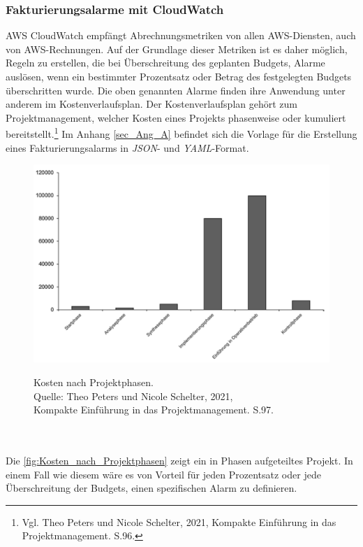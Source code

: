 \subsubsection*{Fakturierungsalarme mit CloudWatch}
AWS CloudWatch empfängt Abrechnungsmetriken von allen AWS-Diensten, auch von AWS-Rechnungen. Auf der Grundlage dieser Metriken ist es daher möglich, Regeln zu erstellen, die bei Überschreitung des geplanten Budgets, Alarme auslösen, wenn ein bestimmter Prozentsatz oder Betrag des festgelegten Budgets überschritten wurde. Die oben genannten Alarme finden ihre Anwendung unter anderem im Kostenverlaufsplan. Der Kostenverlaufsplan gehört zum Projektmanagement, welcher Kosten eines Projekts phasenweise oder kumuliert bereitstellt.\footnote{Vgl. Theo Peters und Nicole Schelter, 2021, Kompakte Einführung in das Projektmanagement. S.96\cite{PM1}.} Im Anhang \ref{sec_Ang_A} befindet sich die Vorlage für die Erstellung eines Fakturierungsalarms in \textit{JSON}- und \textit{YAML}-Format.
\begin{figure}[h!]
  \centering
  \includegraphics[scale=0.45]{sources/Kosten_nach_Projektphasen}
  \caption[Kosten nach Projektphasen]{}
  \label{fig:Kosten_nach_Projektphasen} 
  Kosten nach Projektphasen.\\
  Quelle: Theo Peters und Nicole Schelter, 2021, \\
  Kompakte Einführung in das Projektmanagement. S.97\cite{PM1}.
\end{figure}
\\\\
Die \autoref{fig:Kosten_nach_Projektphasen} zeigt ein in Phasen aufgeteiltes Projekt. In einem Fall wie diesem wäre es von Vorteil für jeden Prozentsatz oder jede Überschreitung der Budgets, einen spezifischen Alarm zu definieren.
\newpage
